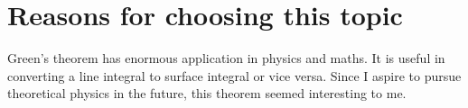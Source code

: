 \documentclass{article}
\begin{document}
\section*{Reasons for choosing this topic }
Green's theorem has enormous application in physics and maths. It is useful in converting a line integral to surface integral or vice versa. Since I aspire to pursue theoretical physics in the future, this theorem seemed interesting to me.


\end{document}
